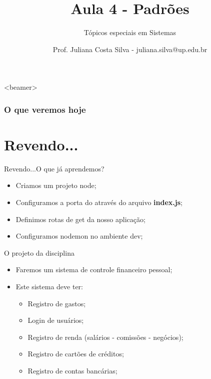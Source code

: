 \documentclass{beamer}
\title{Aula 4  - Padrões}
\subtitle{Tópicos especiais em Sistemas}
\author{Prof. Juliana Costa Silva - juliana.silva@up.edu.br}
\begin{document}
  \frame[c]{\maketitle}
      \begin{frame}<beamer>
      \frametitle{O que veremos hoje}
      \tableofcontents
    \end{frame}
    \section{Revendo...}
    \begin{frame}{Revendo...}{O que já aprendemos?}
      
      \begin{itemize}
            \item Criamos um projeto node;
            \item Configuramos a porta do através do arquivo \textbf{index.js};
            \item Definimos rotas de get da nosso aplicação;
            \item Configuramos nodemon no ambiente dev;
       \end{itemize}
     \end{frame}
\begin{frame}[label=proof]{O projeto da disciplina}
	\begin{itemize}
	\item Faremos um sistema de controle financeiro pessoal;
	\item Este sistema deve ter:
	\begin{itemize}
	\item Registro de gastos;
	\item Login de usuários;
	\item Registro de renda (salários - comissões - negócios);
	\item Registro de cartões de créditos;
	\item Registro de contas bancárias;
	\end{itemize}
	\end{itemize}
    \end{frame}
\end{document}
